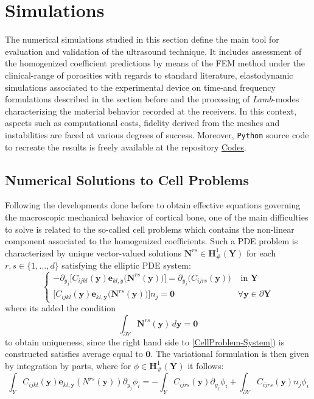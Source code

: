 \chapter{Simulations}
The numerical simulations studied in this section define the main tool for evaluation and validation of the ultrasound technique. It includes assessment of the homogenized coefficient predictions by means of the FEM method under the clinical-range of porosities with regards to standard literature, elastodynamic simulations associated to the experimental device on time-and frequency formulations described in the section before and the processing of \textit{Lamb}-modes characterizing the material behavior recorded at the receivers. In this context, aspects such as computational costs, fidelity derived from the meshes and instabilities are faced at various degrees of success.
Moreover, \texttt{Python} source code to recreate the results is freely available at the repository \href{www.github.com/PublicMistakes/Codes}{Codes}.

\section{Numerical Solutions to Cell Problems}
Following the developments done before to obtain effective equations governing the macroscopic mechanical behavior of cortical bone, one of the main difficulties to solve is related to the so-called cell problems which contains the non-linear component associated to the homogenized coefficients.
Such a PDE problem is characterized by unique vector-valued solutions $\mathbf{N}^{rs} \in \mathbf{H}^1_{\#} (\mathbf{Y})$ for each $r,s \in \{1,\dots, d\}$ satisfying the elliptic PDE system:
\begin{equation*}
    \label{CellProblem-System}
    \left \{
    \begin{array}{cc}
        - \partial_{y_j} \big[C_{ijkl}(\mathbf{y}) \mathbf{e}_{kl,y} \big( \mathbf{N}^{rs}(\mathbf{y}) \big)  \big] = \partial_{y_j} \big( C_{ijrs} (\mathbf{y}) \big)& \text{ in } \mathbf{Y} \\
        \big[ C_{ijkl}(\mathbf{y}) \mathbf{e}_{kl,\mathbf{y}}\big( \mathbf{N}^{rs}(\mathbf{y}) \big) \big]n_j = \mathbf{0} &  \forall \mathbf{y} \in \partial \mathbf{Y}
    \end{array}
    \right.
\end{equation*}
where its added the condition 
\begin{equation*}
    \int_{\partial Y} \mathbf{N}^{rs}(\mathbf{y}) \, d\mathbf{y} = \mathbf{0}
\end{equation*}
to obtain uniqueness, since the right hand side to \ref{CellProblem-System}) is constructed satisfies average equal to $\mathbf{0}$.
The variational formulation is then given by integration by parts, where for $\phi \in \mathbf{H}^1_{\#}(\mathbf{Y})$ it follows:
\begin{equation*}
    \int_{Y} C_{ijkl}(\mathbf{y}) \mathbf{e}_{kl,\mathbf{y}}(N^{rs}(\mathbf{y})) \partial_{y_j}\phi_i = - \int_{Y}C_{ijrs}(\mathbf{y}) \partial_{y_j} \phi_i + \int_{\partial Y}C_{ijrs}(\mathbf{y}) n_j \phi_i
\end{equation*}

